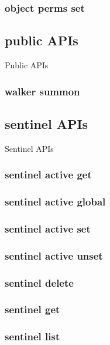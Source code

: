 \subsubsection{object perms set}

\subsection{public APIs}

Public  APIs

\subsubsection{walker summon}

\subsection{sentinel APIs}

Sentinel APIs

\subsubsection{sentinel active get}

\subsubsection{sentinel active global}

\subsubsection{sentinel active set}

\subsubsection{sentinel active unset}

\subsubsection{sentinel delete}

\subsubsection{sentinel get}

\subsubsection{sentinel list}

